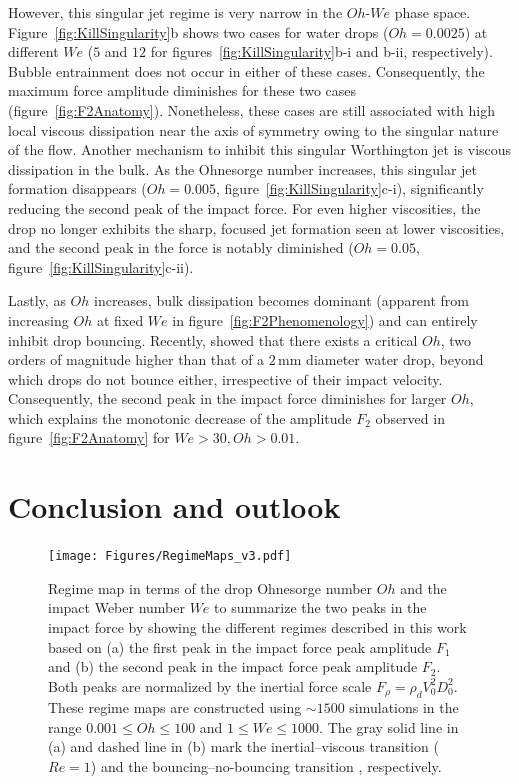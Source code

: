 \documentclass{jfm}
\begin{document}
However, this singular jet regime is very narrow in the $Oh$-$We$ phase space. Figure~\ref{fig:KillSingularity}b shows two cases for water drops ($Oh = 0.0025$) at different $We$ ($5$ and $12$ for figures~\ref{fig:KillSingularity}b-i and b-ii, respectively). Bubble entrainment does not occur in either of these cases. Consequently, the maximum force amplitude diminishes for these two cases (figure~\ref{fig:F2Anatomy}). Nonetheless, these cases are still associated with high local viscous dissipation near the axis of symmetry owing to the singular nature of the flow. Another mechanism to inhibit this singular Worthington jet is viscous dissipation in the bulk. As the Ohnesorge number increases, this singular jet formation disappears ($Oh = 0.005$, figure~\ref{fig:KillSingularity}c-i), significantly reducing the second peak of the impact force. For even higher viscosities, the drop no longer exhibits the sharp, focused jet formation seen at lower viscosities, and the second peak in the force is notably diminished ($Oh = 0.05$, figure~\ref{fig:KillSingularity}c-ii).

Lastly,  as $Oh$ increases, bulk dissipation becomes dominant (apparent from increasing $Oh$ at fixed $We$ in figure~\ref{fig:F2Phenomenology}) and can entirely inhibit drop bouncing. Recently, \citet{Jha2020, sanjay_chantelot_lohse_2023} showed that there exists a critical $Oh$, two orders of magnitude higher than that of a $2\,\si{\milli\meter}$ diameter water drop, beyond which drops do not bounce either, irrespective of their impact velocity. Consequently, the second peak in the impact force diminishes for larger $Oh$, which explains the monotonic decrease of the amplitude $F_2$ observed in figure~\ref{fig:F2Anatomy} for $We > 30, Oh > 0.01$.

\section{Conclusion and outlook}\label{sec:Conclusion}

\begin{figure}
	\centering
	\texttt{[image: Figures/RegimeMaps\_v3.pdf]}
	\caption{Regime map in terms of the drop Ohnesorge number $Oh$ and the impact Weber number $We$ to summarize the two peaks in the impact force by showing the different regimes described in this work based on (a) the first peak in the impact force peak amplitude $F_1$ and (b) the second peak in the impact force peak amplitude $F_2$. Both peaks are normalized by the inertial force scale $F_\rho = \rho_dV_0^2D_0^2$. These regime maps are constructed using $\sim 1500$ simulations in the range $0.001 \leq Oh \leq 100$ and $1 \leq We \leq 1000$. The gray solid line in (a) and dashed line in (b) mark the inertial--viscous transition ($Re = 1$) and the bouncing--no-bouncing transition \citep[$Oh_c = 0.53$ for $Bo = 1$, see][]{sanjay_chantelot_lohse_2023}, respectively.}
	\label{fig:RegimeMaps}
\end{figure}
\end{document}
